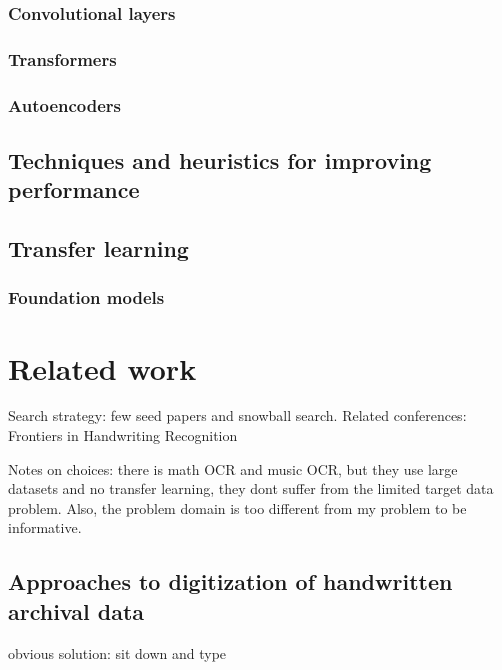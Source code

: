 \documentclass{article}
\begin{document}
\subsubsection{Convolutional layers}

\subsubsection{Transformers}

\subsubsection{Autoencoders}

\subsection{Techniques and heuristics for improving performance}

\subsection{Transfer learning}

\subsubsection{Foundation models}

\section{Related work}


Search strategy: few seed papers and snowball search. Related conferences: 
Frontiers in Handwriting Recognition

Notes on choices: there is math OCR and music OCR, but they use large datasets and no transfer learning, they dont suffer from the limited target data problem. Also, the problem domain is too different from my problem to be informative.

\subsection{Approaches to digitization of handwritten archival data}

obvious solution: sit down and type
\end{document}
